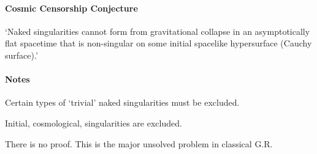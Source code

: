 \paragraph{Cosmic Censorship Conjecture}  `Naked singularities cannot form 
from gravitational collapse in an asymptotically flat spacetime that is
non-singular on some initial spacelike hypersurface (Cauchy surface).' \\

\paragraph{Notes}
\begin{list}{()}
{}
\item Certain types of `trivial' naked singularities must be excluded.

\item  Initial, cosmological, singularities are excluded.

\item There is no proof.  This is the major unsolved problem in classical G.R.
\end{list}
